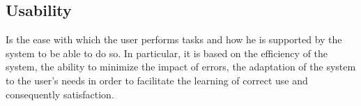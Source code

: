 \subsection{Usability}

Is the ease with which the user performs tasks and how he is supported by the system to be able to do so. In particular, it is based on the efficiency of the system, the ability to minimize the impact of errors, the adaptation of the system to the user's needs in order to facilitate the learning of correct use and consequently satisfaction.